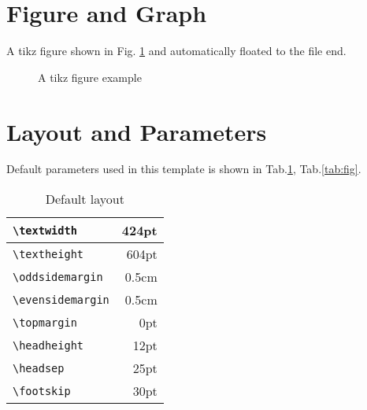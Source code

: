\documentclass{kuee_en}
\begin{document}
\section{Figure and Graph}
A tikz figure shown in Fig. \ref{fig:tikz} and automatically floated to the file end.

\begin{figure}
    \centering
  \caption{A tikz figure example}
  \label{fig:tikz}
\end{figure}


\section{Layout and Parameters}
Default parameters used in this template is shown in Tab.\ref{tab:text}, Tab.\ref{tab:fig}.

\begin{table}
  \caption{Default layout}\label{tab:text}
  \begin{center}
    \begin{tabular}{|l|r|}
      \hline
      \verb+\textwidth+ & 424pt \\ \hline
      \verb+\textheight+ & 604pt \\ \hline
      \verb+\oddsidemargin+ & 0.5cm \\ \hline
      \verb+\evensidemargin+ & 0.5cm \\ \hline
      \verb+\topmargin+ & 0pt \\ \hline
      \verb+\headheight+ &12pt \\ \hline
      \verb+\headsep+ & 25pt \\ \hline
      \verb+\footskip+ & 30pt \\ \hline
    \end{tabular}
  \end{center}
\end{table}
\end{document}
